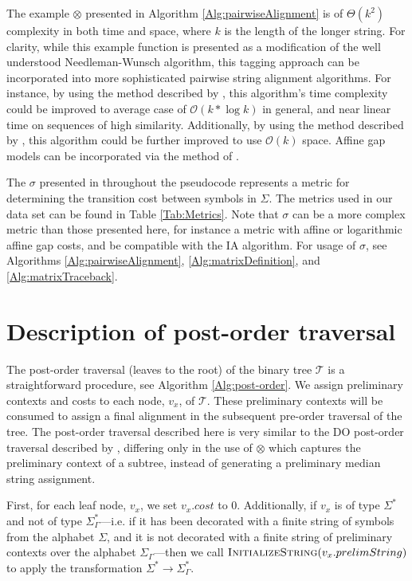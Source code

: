 \documentclass{bmcart}
\begin{document}
The example $\otimes$ presented in Algorithm \ref{Alg:pairwiseAlignment} is of $\Theta\left( k^2 \right)$ complexity in both time and space, where $k$ is the length of the longer string.
For clarity, while this example function is presented as a modification of the well understood Needleman-Wunsch algorithm, this tagging approach can be incorporated into more sophisticated pairwise string alignment algorithms.
For instance, by using the method described by \cite{Ukkonen1985}, this algorithm's time complexity could be improved to average case of $\mathcal{O}\left( k * \log k \right)$ in general, and near linear time on sequences of high similarity.
Additionally, by using the method described by \cite{Hirschberg1975}, this algorithm could be further improved to use $\mathcal{O}\left( k \right)$ space.
Affine gap models can be incorporated via the method of \cite{VaronandWheeler2012}.


The $\sigma$ presented in throughout the pseudocode represents a metric for determining the transition cost between symbols in $\Sigma$. The metrics used in our data set can be found in Table \ref{Tab:Metrics}.
Note that $\sigma$ can be a more complex metric than those presented here, for instance a metric with affine or logarithmic affine gap costs, and be compatible with the IA algorithm. For usage of $\sigma$, see Algorithms \ref{Alg:pairwiseAlignment}, \ref{Alg:matrixDefinition}, and \ref{Alg:matrixTraceback}.


\section*{Description of post-order traversal}

The post-order traversal (leaves to the root) of the binary tree $\mathcal{T}$ is a straightforward procedure, see Algorithm \ref{Alg:post-order}.
We assign preliminary contexts and costs to each node, $v_x$, of $\mathcal{T}$.
These preliminary contexts will be consumed to assign a final alignment in the subsequent pre-order traversal of the tree.
The post-order traversal described here is very similar to the DO post-order traversal described by \cite{Wheeler2003}, differing only in the use of $\otimes$ which captures the preliminary context of a subtree, instead of generating a preliminary median string assignment.

First, for each leaf node, $v_x$, we set $v_x.cost$ to $0$.
Additionally, if $v_x$ is of type $\Sigma^{*}$ and not of type $\Sigma^{*}_{\Gamma}$---i.e. if it has been decorated with a finite string of symbols from the alphabet $\Sigma$, and it is not decorated with a finite string of preliminary contexts over the alphabet $\Sigma_{\Gamma}$---then we call $\Call{InitializeString}{v_x.prelimString}$ to apply the transformation $\Sigma^{*} \rightarrow \Sigma^{*}_{\Gamma}$.
\end{document}
